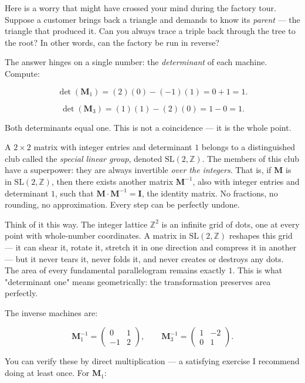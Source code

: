 

Here is a worry that might have crossed your mind during the factory tour. Suppose a customer brings back a triangle and demands to know its \textit{parent} --- the triangle that produced it. Can you always trace a triple back through the tree to the root? In other words, can the factory be run in reverse?

The answer hinges on a single number: the \textit{determinant} of each machine. Compute:

\[
\det(\mathbf{M}_1) = (2)(0) - (-1)(1) = 0 + 1 = 1.\]

\[
\det(\mathbf{M}_3) = (1)(1) - (2)(0) = 1 - 0 = 1.\]

Both determinants equal one. This is not a coincidence --- it is the whole point.

A $2 \times 2$ matrix with integer entries and determinant $1$ belongs to a distinguished club called the \textit{special linear group}, denoted $\mathrm{SL}(2, \mathbb{Z})$. The members of this club have a superpower: they are always invertible \textit{over the integers}. That is, if $\mathbf{M}$ is in $\mathrm{SL}(2, \mathbb{Z})$, then there exists another matrix $\mathbf{M}^{-1}$, also with integer entries and determinant $1$, such that $\mathbf{M} \cdot \mathbf{M}^{-1} = \mathbf{I}$, the identity matrix. No fractions, no rounding, no approximation. Every step can be perfectly undone.

Think of it this way. The integer lattice $\mathbb{Z}^2$ is an infinite grid of dots, one at every point with whole-number coordinates. A matrix in $\mathrm{SL}(2, \mathbb{Z})$ reshapes this grid --- it can shear it, rotate it, stretch it in one direction and compress it in another --- but it never tears it, never folds it, and never creates or destroys any dots. The area of every fundamental parallelogram remains exactly $1$. This is what "determinant one" means geometrically: the transformation preserves area perfectly.

The inverse machines are:

\[
\mathbf{M}_1^{-1} = \begin{pmatrix} 0 & 1 \\ -1 & 2 \end{pmatrix}, \qquad
\mathbf{M}_3^{-1} = \begin{pmatrix} 1 & -2 \\ 0 & 1 \end{pmatrix}.\]

You can verify these by direct multiplication --- a satisfying exercise I recommend doing at least once. For $\mathbf{M}_1$:

